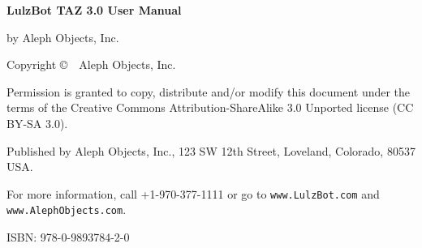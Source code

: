 \clearpage\null\vfill
\begingroup 
\thispagestyle{empty}
\footnotesize\raggedright
\setlength{\parskip}{0.5\baselineskip}

\textbf{LulzBot\textsuperscript{\miniscule{\texttrademark}} TAZ 3.0 User Manual}

by Aleph Objects, Inc.

Copyright \copyright\ \the\year\ Aleph Objects, Inc.\par
Permission is granted to copy, distribute and\slash or modify 
this document under the terms of the
Creative Commons Attribution-ShareAlike 3.0 Unported license
(CC BY-SA 3.0).

Published by Aleph Objects, Inc., 123 SW 12th Street, Loveland, Colorado, 80537 USA.

For more information, call +1-970-377-1111 or go to \texttt{www.LulzBot.com} and \texttt{www.AlephObjects.com}.

ISBN: 978-0-9893784-2-0
\hfill\texttt{\the\year\the\month\the\day}
\endgroup
\pagebreak{}
